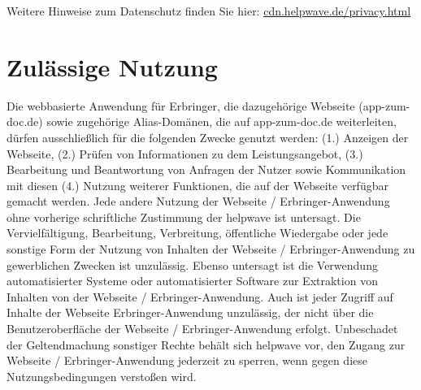 \documentclass[10pt]{article}
\begin{document}
Weitere Hinweise zum Datenschutz finden Sie hier: \href{https://cdn.helpwave.de/privacy.html}{cdn.helpwave.de/privacy.html}

\section{Zulässige Nutzung}
Die webbasierte Anwendung für Erbringer, die dazugehörige Webseite (app-zum-doc.de) sowie zugehörige Alias-Domänen,
die auf app-zum-doc.de weiterleiten, dürfen ausschließlich für die folgenden Zwecke genutzt werden:
(1.) Anzeigen der Webseite, (2.) Prüfen von Informationen zu dem Leistungsangebot, (3.) Bearbeitung und Beantwortung von Anfragen der Nutzer
sowie Kommunikation mit diesen (4.) Nutzung weiterer Funktionen, die auf der Webseite verfügbar gemacht werden. Jede
andere Nutzung der Webseite / Erbringer-Anwendung ohne vorherige schriftliche Zustimmung der helpwave ist untersagt.
Die Vervielfältigung, Bearbeitung, Verbreitung, öffentliche Wiedergabe oder jede sonstige Form der Nutzung von Inhalten
der Webseite / Erbringer-Anwendung zu gewerblichen Zwecken ist unzulässig. Ebenso untersagt ist die Verwendung automatisierter Systeme oder automatisierter Software zur Extraktion von Inhalten von der Webseite / Erbringer-Anwendung.
Auch ist jeder Zugriff auf Inhalte der Webseite Erbringer-Anwendung unzulässig, der nicht über die Benutzeroberfläche der
Webseite / Erbringer-Anwendung erfolgt.
Unbeschadet der Geltendmachung sonstiger Rechte behält sich helpwave vor, den Zugang zur Webseite / Erbringer-Anwendung jederzeit zu sperren, wenn gegen diese Nutzungsbedingungen verstoßen wird.
\end{document}
